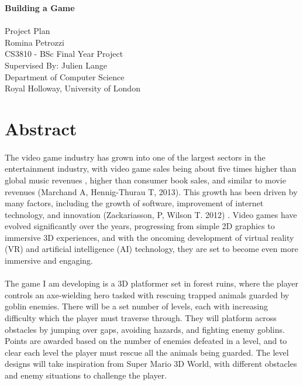 \documentclass[12pt]{article}
\begin{document}
\begin{titlepage}
    \centering
    \vspace*{5cm}
    \LARGE\textbf{Building a Game}\\
    \vspace{1cm}
    \hrulefill\\[0.5cm] %
    \large Project Plan\\
    \vspace{0.5cm}
    \large Romina Petrozzi\\
    \vspace{0.5cm}
    \large CS3810 - BSc Final Year Project\\
    \vspace{2cm}
    \large Supervised By: Julien Lange\\
    \vspace{0.5cm}
    \large Department of Computer Science\\
    \large Royal Holloway, University of London\\
    \vfill
\end{titlepage}



\section*{\centering Abstract}
\paragraph{}
The video game industry has grown into one of the largest sectors in the entertainment industry, with video game sales being about five times higher than global music revenues , higher than consumer book sales, and similar to movie revenues (Marchand A, Hennig-Thurau T, 2013). This growth has been driven by many factors, including the growth of software, improvement of internet technology, and innovation (Zackariasson, P, Wilson T. 2012) . Video games have evolved significantly over the years, progressing from simple 2D graphics to immersive 3D experiences, and with the oncoming development of virtual reality (VR) and artificial intelligence (AI) technology, they are set to become even more immersive and engaging.
\paragraph{}
The game I am developing is a 3D platformer set in forest ruins, where the player controls an axe-wielding hero tasked with rescuing trapped animals guarded by goblin enemies. There will be a set number of levels, each with increasing difficulty which the player must traverse through. They will platform across obstacles by jumping over gaps, avoiding hazards, and fighting enemy goblins. Points are awarded based on the number of enemies defeated in a level, and to clear each level the player must rescue all the animals being guarded. The level designs will take inspiration from Super Mario 3D World, with different obstacles and enemy situations to challenge the player. 
\end{document}
